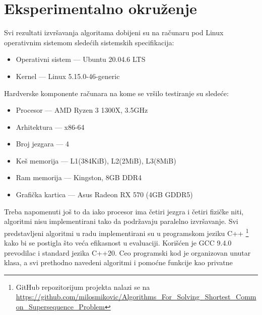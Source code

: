 \documentclass[12pt,oneside]{memoir}
\begin{document}
\section{Eksperimentalno okruženje}
\label{sec:ekspOkruženje}
Svi rezultati izvršavanja algoritama dobijeni su na računaru pod Linux operativnim sistemom
sledećih sistemskih specifikacija:
\begin{itemize}
  \item Operativni sistem — Ubuntu 20.04.6 LTS
  \item Kernel — Linux 5.15.0-46-generic
\end{itemize}
Hardverske komponente računara na kome se vršilo testiranje su sledeće:
\begin{itemize}
  \item Procesor — AMD Ryzen 3 1300X, 3.5GHz
  \item Arhitektura — x86-64
  \item Broj jezgara — 4
  \item Keš memorija — L1(384KiB), L2(2MiB), L3(8MiB)
  \item Ram memorija — Kingston, 8GB DDR4
  \item Grafička kartica — Asus Radeon RX 570 (4GB GDDR5)
\end{itemize}
Treba napomenuti još to da iako procesor ima četiri jezgra i četiri
fizičke niti, algoritmi nisu implementirani tako da podržavaju paralelno izvršavanje.
Svi predstavljeni algoritmi u radu implementirani su u programskom jeziku C++
\footnote{GitHub repozitorijum projekta nalazi se na
\url{https://github.com/milosmikovic/Algorithms_For_Solving_Shortest_Common_Supersequence_Problem}}
kako bi se postigla što veća efikasnost u evaluaciji. Korišćen je
GCC 9.4.0 prevodilac i standard jezika C++20. Ceo programski kod je organizovan
unutar klasa, a svi prethodno navedeni algoritmi i pomoćne funkcije kao privatne
\end{document}
